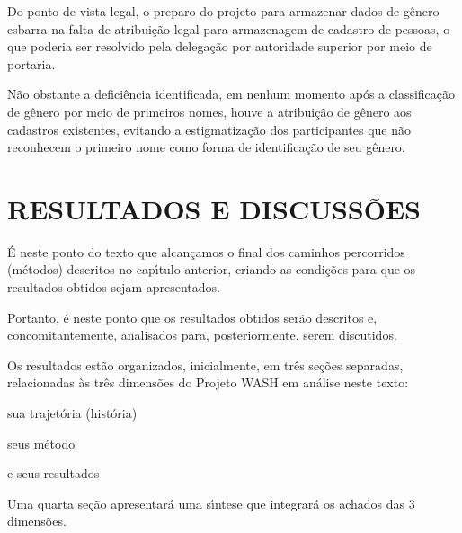 \documentclass[
12pt,		%
openright,	%
twoside,  %
a4paper,			%
chapter=TITLE,		%
english,			%
french,				%
spanish,			%
brazil				%
]{USPSC-classe/USPSC_RedarTex}
\begin{document}
Do ponto de vista legal, o preparo do projeto para armazenar dados de g\^enero esbarra na falta de atribui\c{c}\~ao legal para armazenagem de cadastro de pessoas, o que poderia ser resolvido pela delega\c{c}\~ao por autoridade superior por meio de portaria.








N\~ao obstante a defici\^encia identificada, em nenhum momento ap\'os a classifica\c{c}\~ao de g\^enero por meio de primeiros nomes, houve a atribui\c{c}\~ao de g\^enero aos cadastros existentes, evitando a estigmatiza\c{c}\~ao dos participantes que n\~ao reconhecem o primeiro nome como forma de identifica\c{c}\~ao de seu g\^enero.








\chapter[RESULTADOS E DISCUSS\~OES]{RESULTADOS E DISCUSS\~OES}\label{RESULTADOS E DISCUSS\~OES}
\'E neste ponto do texto que alcan\c{c}amos o final dos caminhos percorridos (m\'etodos) descritos no cap\'{\i}tulo anterior, criando as condi\c{c}\~oes para que os resultados obtidos sejam apresentados.








Portanto, \'e neste ponto que os resultados obtidos ser\~ao descritos e, concomitantemente, analisados para, posteriormente, serem discutidos.








Os resultados est\~ao organizados, inicialmente, em tr\^es se\c{c}\~oes separadas, relacionadas \`as tr\^es dimens\~oes do Projeto WASH em an\'alise neste texto:









\begin{alineas}
\item sua trajet\'oria (hist\'oria)
\item seus m\'etodo
\item e seus resultados
\end{alineas}

Uma quarta se\c{c}\~ao apresentar\'a uma s\'{\i}ntese que integrar\'a os achados das 3 dimens\~oes.
\end{document}
